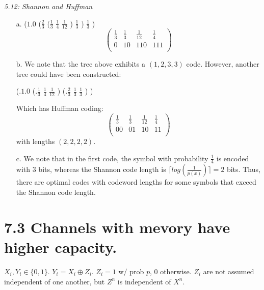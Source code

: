 \documentclass[10pt]{article}
\begin{document}
\begin{tiny}
\begin{multicols}{3}
\textit{5.12: Shannon and Huffman}
\begin{itemize}
	\item[a.]
($1.0$ ($\frac{2}{3}$ ($\frac{1}{3}$ $\frac{1}{4}$ $\frac{1}{12}$ ) $\frac{1}{3}$ ) $\frac{1}{3}$ )
\[
 \begin{pmatrix}
	\frac{1}{3} & \frac{1}{3} & \frac{1}{12} & \frac{1}{4}\\
	0           &  10         & 110          & 111\\
 \end{pmatrix}
\]
	\item[b.] We note that the tree above exhibits a $(1,2,3,3)$ code. However, another tree could have been constructed: 

(.$1.0$ (.$\frac{1}{3}$ $\frac{1}{4}$ $\frac{1}{12}$ ) (.$\frac{2}{3}$ $\frac{1}{3}$ $\frac{1}{3}$ ) ) 

Which has Huffman coding:
\[
 \begin{pmatrix}
	\frac{1}{3} & \frac{1}{3} & \frac{1}{12} & \frac{1}{4}\\
	00           &  01         & 10          & 11\\
 \end{pmatrix}
\] with lengths $(2, 2, 2, 2)$.
	\item[c.] We note that in the first code, the symbol with probability $\frac{1}{4}$ is encoded with $3$ bits, whereas the Shannon code length is $\lceil log(\frac{1}{p(x)}) \rceil = 2$ bits. Thus, there are optimal codes with codeword lengths for some symbols that exceed the Shannon code length.
\end{itemize}

\section*{7.3 Channels with mevory have higher capacity.}
    $X_i, Y_i \in \{0,1\}$.
    $Y_i = X_i \oplus Z_i$.
    $Z_i = 1$ w/ prob $p$, 0 otherwise.
    $Z_i$ are not assumed independent of one another, but $Z^n$ is independent of $X^n$.


\end{multicols}
\end{tiny}
\end{document}
